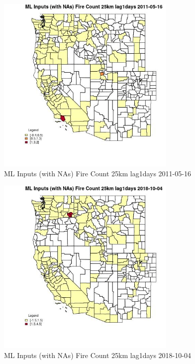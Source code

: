 \begin{figure} 
\centering  
\includegraphics[width=0.77\textwidth]{Code_Outputs/Report_ML_input_PM25_Step4_part_f_de_duplicated_aveswNAs_CountyFire_Count_25km_lag1daysMean2011-05-16.jpg} 
\caption{\label{fig:Report_ML_input_PM25_Step4_part_f_de_duplicated_aveswNAsCountyFire_Count_25km_lag1daysMean2011-05-16}ML Inputs (with NAs) Fire Count 25km lag1days 2011-05-16} 
\end{figure} 
 

\begin{figure} 
\centering  
\includegraphics[width=0.77\textwidth]{Code_Outputs/Report_ML_input_PM25_Step4_part_f_de_duplicated_aveswNAs_CountyFire_Count_25km_lag1daysMean2018-10-04.jpg} 
\caption{\label{fig:Report_ML_input_PM25_Step4_part_f_de_duplicated_aveswNAsCountyFire_Count_25km_lag1daysMean2018-10-04}ML Inputs (with NAs) Fire Count 25km lag1days 2018-10-04} 
\end{figure} 
 

